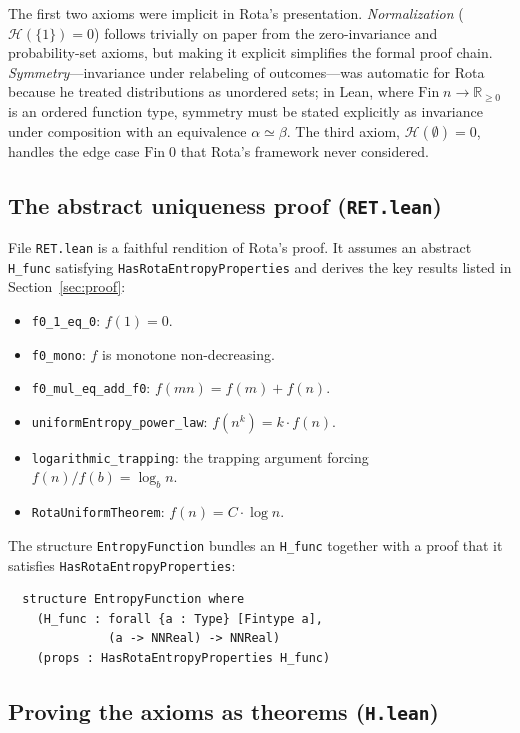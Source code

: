 \documentclass[12pt,a4paper]{article}
\theoremstyle{definition}
\newcommand{\lean}[1]{\texttt{#1}}
\newcommand{\Hfunc}{\mathcal{H}}
\newcommand{\NNR}{\mathbb{R}_{\geq 0}}
\begin{document}
The first two axioms were implicit in Rota's presentation.
\emph{Normalization} ($\Hfunc(\{1\}) = 0$) follows trivially on paper
from the zero-invariance and probability-set axioms, but making it
explicit simplifies the formal proof chain.  \emph{Symmetry}---invariance
under relabeling of outcomes---was automatic for Rota because he treated
distributions as unordered sets; in Lean, where $\mathrm{Fin}\;n \to
\NNR$ is an ordered function type, symmetry must be stated
explicitly as invariance under composition with an equivalence
$\alpha \simeq \beta$.  The third axiom, $\Hfunc(\emptyset) = 0$,
handles the edge case $\mathrm{Fin}\;0$ that Rota's framework never
considered.

\subsection{The abstract uniqueness proof (\texttt{RET.lean})}

File \lean{RET.lean} is a faithful rendition of Rota's proof.  It
assumes an abstract \lean{H\_func} satisfying
\lean{HasRotaEntropyProperties} and derives the key results listed in
Section~\ref{sec:proof}:

\begin{itemize}[nosep]
  \item \lean{f0\_1\_eq\_0}: $f(1) = 0$.
  \item \lean{f0\_mono}: $f$ is monotone non-decreasing.
  \item \lean{f0\_mul\_eq\_add\_f0}: $f(mn) = f(m) + f(n)$.
  \item \lean{uniformEntropy\_power\_law}: $f(n^k) = k \cdot f(n)$.
  \item \lean{logarithmic\_trapping}: the trapping argument forcing
    $f(n)/f(b) = \log_b n$.
  \item \lean{RotaUniformTheorem}: $f(n) = C \cdot \log n$.
\end{itemize}

The structure \lean{EntropyFunction} bundles an \lean{H\_func} together
with a proof that it satisfies \lean{HasRotaEntropyProperties}:

\begin{verbatim}
  structure EntropyFunction where
    (H_func : forall {a : Type} [Fintype a],
              (a -> NNReal) -> NNReal)
    (props : HasRotaEntropyProperties H_func)
\end{verbatim}

\subsection{Proving the axioms as theorems (\texttt{H.lean})}
\end{document}
